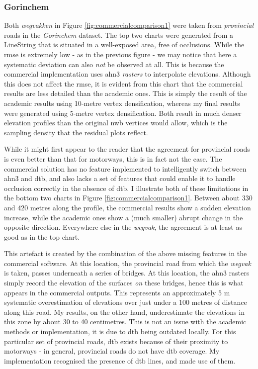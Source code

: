 \subsubsection{Gorinchem}

Both \textit{wegvakken} in Figure \ref{fig:commercialcomparison1} were taken from \textit{provincial} roads in the \textit{Gorinchem} dataset. The top two charts were generated from a LineString that is situated in a well-exposed area, free of occlusions. While the \ac{rmse} is extremely low - as in the previous figure - we may notice that here a systematic deviation can also \textit{not} be observed at all. This is because the commercial implementation uses \ac{ahn3} \textit{rasters} to interpolate elevations. Although this does not affect the \ac{rmse}, it is evident from this chart that the commercial results are less detailed than the academic ones. This is simply the result of the academic results using 10-metre vertex densification, whereas my final results were generated using 5-metre vertex densification. Both result in much denser elevation profiles than the original \ac{nwb} vertices would allow, which is the sampling density that the residual plots reflect.

While it might first appear to the reader that the agreement for provincial roads is even better than that for motorways, this is in fact not the case. The commercial solution has no feature implemented to intelligently switch between \ac{ahn3} and \ac{dtb}, and also lacks a set of features that could enable it to handle occlusion correctly in the absence of \ac{dtb}. I illustrate both of these limitations in the bottom two charts in Figure \ref{fig:commercialcomparison1}. Between about 330 and 420 metres along the profile, the commercial results show a sudden elevation increase, while the academic ones show a (much smaller) abrupt change in the opposite direction. Everywhere else in the \textit{wegvak}, the agreement is at least as good as in the top chart.

This artefact is created by the combination of the above missing features in the commercial software. At this location, the provincial road from which the \textit{wegvak} is taken, passes underneath a series of bridges. At this location, the \ac{ahn3} rasters simply record the elevation of the surfaces \textit{on} these bridges, hence this is what appears in the commercial outputs. This represents an approximately 5 m systematic overestimation of elevations over just under a 100 metres of distance along this road. My results, on the other hand, underestimate the elevations in this zone by about 30 to 40 centimetres. This is not an issue with the academic methods or implementation, it is due to \ac{dtb} being outdated locally. For this particular set of provincial roads, \ac{dtb} exists because of their proximity to motorways - in general, provincial roads do not have \ac{dtb} coverage. My implementation recognised the presence of \ac{dtb} lines, and made use of them.

